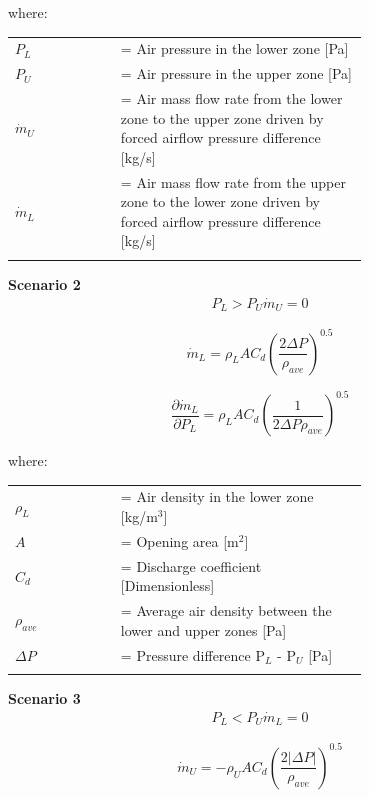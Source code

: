 where:

\begin{tabular}{lp{0.7\linewidth}}
\\
$P_L$ &= Air pressure in the lower zone [Pa] \\
$P_U$ &= Air pressure in the upper zone [Pa] \\
$\dot{m}_U$ &= Air mass flow rate from the lower zone to the upper zone driven by forced airflow pressure difference [kg/s]\\
$\dot{m}_L$ &= Air mass flow rate from the upper zone to the lower zone driven by forced airflow pressure difference [kg/s]\\
\\
\end{tabular}

\textbf{Scenario 2}
\begin{gather}
P_L > P_U
\dot{m}_U = 0
\end{gather}

\begin{equation}
\dot{m}_L = \rho_L A C_d \left( {\frac{2\Delta P}{\rho_{ave}}} \right)^{0.5}
\end{equation}

\begin{equation}
\frac{\partial \dot{m}_L}{\partial {P_L}} = \rho_L A C_d \left( \frac{1}{2\Delta P \rho_{ave}} \right)^{0.5}
\end{equation}

where:

\begin{tabular}{lp{0.7\linewidth}}
\\
$\rho_L$ &= Air density in the lower zone [kg/m\(^{3}\)]\\
$A$ &= Opening area [m\(^{2}\)] \\
$C_d$ &= Discharge coefficient [Dimensionless]\\
$\rho_{ave}$ &= Average air density between the lower and upper zones [Pa] \\
$\Delta P$ &= Pressure difference P\(_{L}\) - P\(_{U}\) [Pa]\\
\\
\end{tabular}

\textbf{Scenario 3}
\begin{gather}
P_L < P_U
\dot{m}_L = 0
\end{gather}

\begin{equation}
\dot{m}_U =  - {\rho_U}A{C_d}{\left( {\frac{{2\left| {\Delta P} \right|}}{{{\rho_{ave}}}}} \right)^{0.5}}
\end{equation}

